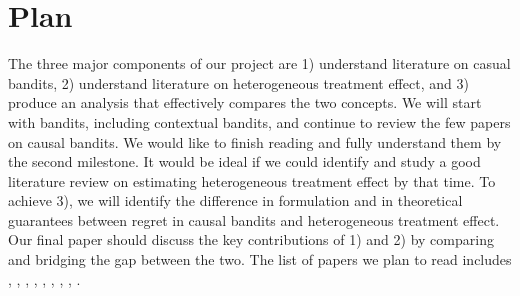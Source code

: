 \documentclass{article}
\begin{document}



\section{Plan}

The three major components of our project are 1) understand literature on casual bandits, 2) understand literature on heterogeneous treatment effect, and 3) produce an analysis that effectively compares the two concepts. We will start with bandits, including contextual bandits, and continue to review the few papers on causal bandits. We would like to finish reading and fully understand them by the second milestone. It would be ideal if we could identify and study a good literature review on estimating heterogeneous treatment effect by that time. To achieve 3), we will identify the difference in formulation and in theoretical guarantees between regret in causal bandits and heterogeneous treatment effect. Our final paper should discuss the key contributions of 1) and 2) by comparing and bridging the gap between the two. The list of papers we plan to read includes \cite{dudik2011efficient}, \cite{lattimore2016causal}, \cite{shalit2017estimating}, \cite{forney2017counterfactual}, \cite{zhang2017transfer}, \cite{athey2016recursive}, \cite{bareinboim2015bandits}, \cite{wager2017estimation},
\cite{johansson2016learning}.





\end{document}
